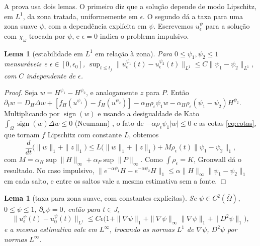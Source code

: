 \documentclass[11pt,a4paper]{article}
\numberwithin{equation}{section}
\newtheorem{lema}[teorema]{Lema}
\theoremstyle{definition}
\theoremstyle{remark}
\begin{document}
A prova usa dois lemas. O primeiro diz que a solução depende de modo Lipschitz, em $L^1$, da zona
tratada, uniformemente em $\epsilon$. O segundo dá a taxa para uma zona suave $\psi$, com a
dependência explícita em $\psi$. Escrevemos $u^\psi_\epsilon$ para a solução com $\chi_\omega$
trocada por $\psi$, e $\epsilon=0$ indica o problema impulsivo.

\begin{lema}[estabilidade em $L^1$ em relação à zona]\label{lem:L1zona}
Para $0\le\psi_1,\psi_2\le1$ mensuráveis e $\epsilon\in[0,\epsilon_0]$,
$\sup_{t\le t_f}\|u^{\psi_1}_\epsilon(t)-u^{\psi_2}_\epsilon(t)\|_{L^1}\le C\|\psi_1-\psi_2\|_{L^1}$, com $C$
independente de $\epsilon$.
\end{lema}

\begin{proof}
Seja $w=H^{\psi_1}-H^{\psi_2}$, e analogamente $z$ para $P$. Então
$\partial_tw=D_H\Delta w+[f_H(u^{\psi_1})-f_H(u^{\psi_2})]-\alpha_H\rho_\epsilon\psi_1w-\alpha_H\rho_\epsilon(\psi_1-\psi_2)H^{\psi_2}$.
Multiplicando por $\operatorname{sign}(w)$ e usando a desigualdade de Kato
$\int_\Omega\operatorname{sign}(w)\Delta w\le0$ (Neumann) \cite{BrezisStrauss}, o fato de
$-\alpha\rho_\epsilon\psi_1|w|\le0$ e as cotas \eqref{eq:cotas}, que tornam $f$ Lipschitz com constante
$L$, obtemos
\[
\frac{d}{dt}\big(\|w\|_1+\|z\|_1\big)\le L\big(\|w\|_1+\|z\|_1\big)+M\rho_\epsilon(t)\|\psi_1-\psi_2\|_1,
\]
com $M=\alpha_H\sup\|H\|_\infty+\alpha_P\sup\|P\|_\infty$. Como $\int\rho_\epsilon=K$, Gronwall dá o
resultado. No caso impulsivo, $\|e^{-\alpha\psi_1}H-e^{-\alpha\psi_2}H\|_1\le\alpha\|H\|_\infty\|\psi_1-\psi_2\|_1$
em cada salto, e entre os saltos vale a mesma estimativa sem a fonte.
\end{proof}

\begin{lema}[taxa para zona suave, com constantes explícitas]\label{lem:suave}
Se $\psi\in C^2(\overline\Omega)$, $0\le\psi\le1$, $\partial_\nu\psi=0$, então para $t\in J_\epsilon$
\[
\|u^\psi_\epsilon(t)-u^\psi_0(t)\|_{L^1}\le C\epsilon\big(1+\|\nabla\psi\|_1+\|\nabla\psi\|_\infty\|\nabla\psi\|_1+\|D^2\psi\|_1\big),
\]
e a mesma estimativa vale em $L^\infty$, trocando as normas $L^1$ de $\nabla\psi$, $D^2\psi$ por normas $L^\infty$.
\end{lema}
\end{document}
